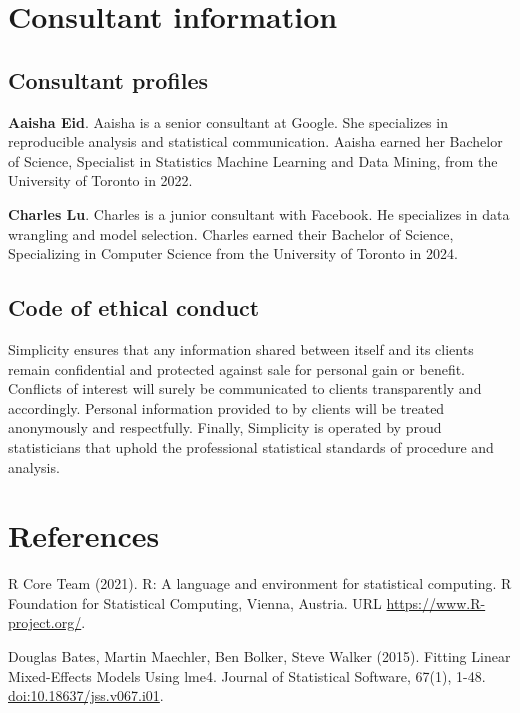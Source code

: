 \documentclass[
          english,
          paper=a4,
              ,captions=tableheading
  ]{scrartcl}
\begin{document}
\newpage

\hypertarget{consultant-information}{%
\section{Consultant information}\label{consultant-information}}

\hypertarget{consultant-profiles}{%
\subsection{Consultant profiles}\label{consultant-profiles}}

\textbf{Aaisha Eid}. Aaisha is a senior consultant at Google. She
specializes in reproducible analysis and statistical communication.
Aaisha earned her Bachelor of Science, Specialist in Statistics Machine
Learning and Data Mining, from the University of Toronto in 2022.

\textbf{Charles Lu}. Charles is a junior consultant with Facebook. He
specializes in data wrangling and model selection. Charles earned their
Bachelor of Science, Specializing in Computer Science from the
University of Toronto in 2024.

\hypertarget{code-of-ethical-conduct}{%
\subsection{Code of ethical conduct}\label{code-of-ethical-conduct}}

Simplicity ensures that any information shared between itself and its
clients remain confidential and protected against sale for personal gain
or benefit. Conflicts of interest will surely be communicated to clients
transparently and accordingly. Personal information provided to by
clients will be treated anonymously and respectfully. Finally,
Simplicity is operated by proud statisticians that uphold the
professional statistical standards of procedure and analysis.

\newpage

\hypertarget{references}{%
\section{References}\label{references}}

R Core Team (2021). R: A language and environment for statistical
computing. R Foundation for Statistical Computing, Vienna, Austria. URL
\url{https://www.R-project.org/}.

Douglas Bates, Martin Maechler, Ben Bolker, Steve Walker (2015). Fitting
Linear Mixed-Effects Models Using lme4. Journal of Statistical Software,
67(1), 1-48. \url{doi:10.18637/jss.v067.i01}.
\end{document}
